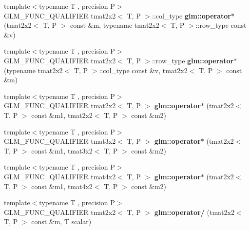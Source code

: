 \begin{DoxyCompactItemize}
{\footnotesize template$<$typename T , precision P$>$ }\\G\+L\+M\+\_\+\+F\+U\+N\+C\+\_\+\+Q\+U\+A\+L\+I\+F\+I\+ER tmat2x2$<$ T, P $>$\+::col\+\_\+type {\bfseries glm\+::operator$\ast$} (tmat2x2$<$ T, P $>$ const \&m, typename tmat2x2$<$ T, P $>$\+::row\+\_\+type const \&v)
\item 
\mbox{\label{type__mat2x2_8inl_ac6036e820bc048e15196afeac0defde7}} 
{\footnotesize template$<$typename T , precision P$>$ }\\G\+L\+M\+\_\+\+F\+U\+N\+C\+\_\+\+Q\+U\+A\+L\+I\+F\+I\+ER tmat2x2$<$ T, P $>$\+::row\+\_\+type {\bfseries glm\+::operator$\ast$} (typename tmat2x2$<$ T, P $>$\+::col\+\_\+type const \&v, tmat2x2$<$ T, P $>$ const \&m)
\item 
\mbox{\label{type__mat2x2_8inl_a6490257bcf679a71b20a7e82ebe54188}} 
{\footnotesize template$<$typename T , precision P$>$ }\\G\+L\+M\+\_\+\+F\+U\+N\+C\+\_\+\+Q\+U\+A\+L\+I\+F\+I\+ER tmat2x2$<$ T, P $>$ {\bfseries glm\+::operator$\ast$} (tmat2x2$<$ T, P $>$ const \&m1, tmat2x2$<$ T, P $>$ const \&m2)
\item 
\mbox{\label{type__mat2x2_8inl_a4d95e330a465ca1f581ca2580730bfa3}} 
{\footnotesize template$<$typename T , precision P$>$ }\\G\+L\+M\+\_\+\+F\+U\+N\+C\+\_\+\+Q\+U\+A\+L\+I\+F\+I\+ER tmat3x2$<$ T, P $>$ {\bfseries glm\+::operator$\ast$} (tmat2x2$<$ T, P $>$ const \&m1, tmat3x2$<$ T, P $>$ const \&m2)
\item 
\mbox{\label{type__mat2x2_8inl_af72b94d4ec87222f66a42ae7bd2cb4b7}} 
{\footnotesize template$<$typename T , precision P$>$ }\\G\+L\+M\+\_\+\+F\+U\+N\+C\+\_\+\+Q\+U\+A\+L\+I\+F\+I\+ER tmat4x2$<$ T, P $>$ {\bfseries glm\+::operator$\ast$} (tmat2x2$<$ T, P $>$ const \&m1, tmat4x2$<$ T, P $>$ const \&m2)
\item 
\mbox{\label{type__mat2x2_8inl_aabdf7de9e4f7db03f43f2a1ac6baaa51}} 
{\footnotesize template$<$typename T , precision P$>$ }\\G\+L\+M\+\_\+\+F\+U\+N\+C\+\_\+\+Q\+U\+A\+L\+I\+F\+I\+ER tmat2x2$<$ T, P $>$ {\bfseries glm\+::operator/} (tmat2x2$<$ T, P $>$ const \&m, T scalar)
\item 

\end{DoxyCompactItemize}
